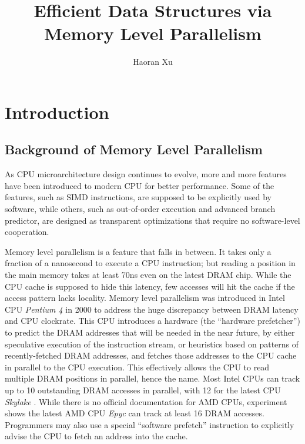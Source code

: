 \documentclass[11pt, usletter]{article}
\begin{document}
\title{Efficient Data Structures via Memory Level Parallelism}
\author{Haoran Xu}
\date{}

\maketitle

\tableofcontents

\newpage

\section{Introduction} \label{introduction}

\subsection{Background of Memory Level Parallelism}

As CPU microarchitecture design continues to evolve, more and more features have been introduced 
to modern CPU for better performance. Some of the features, such as SIMD instructions, 
are supposed to be explicitly used by software, while others, such as out-of-order execution 
and advanced branch predictor, are designed as transparent optimizations that require no 
software-level cooperation.

Memory level parallelism is a feature that falls in between. 
It takes only a fraction of a nanosecond to execute a CPU instruction; 
but reading a position in the main memory takes at least 70ns even on the latest DRAM chip.
While the CPU cache is supposed to hide this latency, few accesses will hit the cache if the access pattern lacks locality.
Memory level parallelism was introduced in Intel CPU \textit{Pentium 4} in 2000 
to address the huge discrepancy between DRAM latency and CPU clockrate.
This CPU introduces a hardware (the ``hardware prefetcher'') to predict the DRAM addresses that will be needed in the near future, 
by either speculative execution of the instruction stream, 
or heuristics based on patterns of recently-fetched DRAM addresses, 
and fetches those addresses to the CPU cache in parallel to the CPU execution.
This effectively allows the CPU to read multiple DRAM positions in parallel, hence the name.
Most Intel CPUs can track up to 10 outstanding DRAM accesses in parallel, 
with 12 for the latest CPU \textit{Skylake} \cite{IntelOptGuide}.
While there is no official documentation for AMD CPUs, 
experiment shows the latest AMD CPU \textit{Epyc} can track at least 16 DRAM accesses. 
Programmers may also use a special ``software prefetch'' instruction to
explicitly advise the CPU to fetch an address into the cache.
\end{document}
